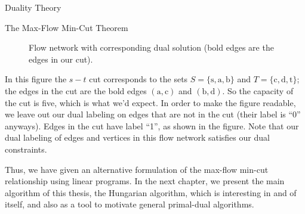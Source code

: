 \begin{section}{Duality Theory}
\begin{subsection}{The Max-Flow Min-Cut Theorem}
\begin{figure}[h]
		\caption{Flow network with corresponding dual solution (bold edges are the edges in our 
		cut).}
	\end{figure}

	In this figure the $s-t$ cut corresponds to the sets $S= \{\mbox{s},\mbox{a},\mbox{b}\}$ and 
	$T = \{\mbox{c},\mbox{d},\mbox{t}\}$; the 
	edges in the cut are the bold edges $(\mbox{a},\mbox{c})$ and $(\mbox{b},\mbox{d})$. 
	So the capacity of the cut is five, 
	which is what we'd expect. In order to make the figure readable, we leave out our dual labeling 
	on edges that are not in the cut (their label is ``0'' anyways). Edges in the cut have label 
	``1'', as shown in the figure. Note that our dual labeling of edges and vertices in this flow 
	network satisfies our dual constraints.

	Thus, we have given an alternative formulation of the max-flow min-cut relationship using 
	linear programs. In the next chapter, we present the main algorithm of this thesis, the 
	Hungarian algorithm, which is interesting in and of itself, and also as a tool to motivate 
	general primal-dual algorithms.
\end{subsection}
\end{section}
